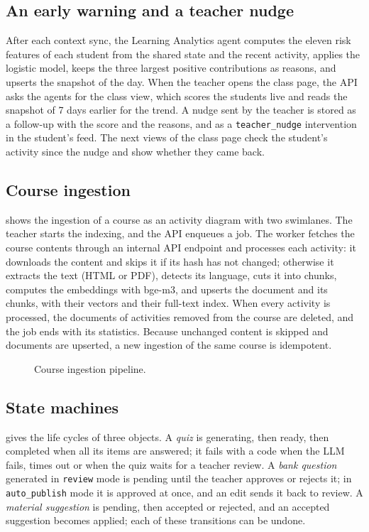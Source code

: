 \subsection{An early warning and a teacher nudge}

After each context sync, the Learning Analytics agent computes the
eleven risk features of each student from the shared state and the
recent activity, applies the logistic model, keeps the three largest
positive contributions as reasons, and upserts the snapshot of the day.
When the teacher opens the class page, the API asks the agents for the
class view, which scores the students live and reads the snapshot of
7 days earlier for the trend. A nudge sent by the teacher is stored as a
follow-up with the score and the reasons, and as a \texttt{teacher\_nudge}
intervention in the student's feed. The next views of the class page
check the student's activity since the nudge and show whether they came
back.

\subsection{Course ingestion}

 shows the ingestion of a course as an activity
diagram with two swimlanes. The teacher starts the indexing, and the API
enqueues a job. The worker fetches the course contents through an
internal API endpoint and processes each activity: it downloads the
content and skips it if its hash has not changed; otherwise it extracts
the text (HTML or PDF), detects its language, cuts it into chunks,
computes the embeddings with bge-m3, and upserts the document and its
chunks, with their vectors and their full-text index. When every activity
is processed, the documents of activities removed from the course are
deleted, and the job ends with its statistics. Because unchanged content
is skipped and documents are upserted, a new ingestion of the same course
is idempotent.

\begin{figure}[htbp]
  \centering
  \caption{Course ingestion pipeline.}
  \label{fig-ingestion}
\end{figure}

\subsection{State machines}

 gives the life cycles of three objects. A \emph{quiz}
is generating, then ready, then completed when all its items are
answered; it fails with a code when the LLM fails, times out or when the
quiz waits for a teacher review. A \emph{bank question} generated in
\texttt{review} mode is pending until the teacher approves or rejects it;
in \texttt{auto\_publish} mode it is approved at once, and an edit sends
it back to review. A \emph{material suggestion} is pending, then accepted
or rejected, and an accepted suggestion becomes applied; each of these
transitions can be undone.


